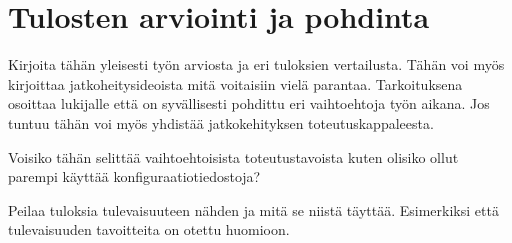 \chapter{Tulosten arviointi ja pohdinta}
\begin{it}
Kirjoita tähän yleisesti työn arviosta ja eri tuloksien vertailusta. Tähän voi myös kirjoittaa jatkoheitysideoista mitä voitaisiin vielä parantaa. Tarkoituksena osoittaa lukijalle että on syvällisesti pohdittu eri vaihtoehtoja työn aikana. Jos tuntuu tähän voi myös yhdistää jatkokehityksen toteutuskappaleesta.

Voisiko tähän selittää vaihtoehtoisista toteutustavoista kuten olisiko ollut parempi käyttää konfiguraatiotiedostoja?

Peilaa tuloksia tulevaisuuteen nähden ja mitä se niistä täyttää. Esimerkiksi että tulevaisuuden tavoitteita on otettu huomioon.
\end{it}
